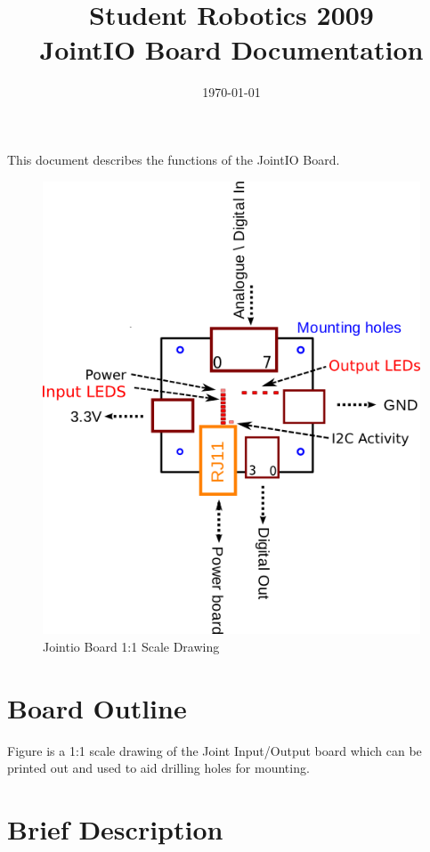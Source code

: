 \documentclass[a4paper, 12pt]{article}
\title {Student Robotics 2009\\ JointIO Board Documentation}
\date{\today}
\begin{document}
\maketitle

\noindent This document describes the functions of the JointIO Board. 

\begin{figure}
\centering
\includegraphics[scale=1, angle=0]{outline}
\caption{Jointio Board 1:1 Scale Drawing}
\label{fig:outline}
\end{figure}


\section{Board Outline}
Figure \label{fig:outline} is a 1:1 scale drawing of the Joint Input/Output board which can be printed out and used to aid drilling holes for mounting.
\label{sec:outline}
\newpage
\section{Brief Description}
\end{document}
